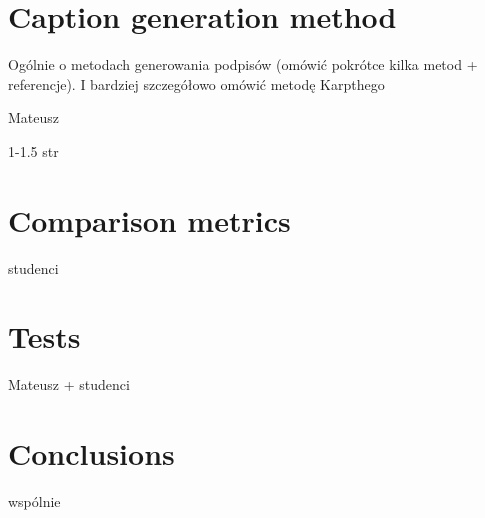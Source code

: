 \documentclass[runningheads]{llncs}
\begin{document}
\section{Caption generation method} 

Ogólnie o metodach generowania podpisów (omówić pokrótce kilka metod + referencje). I bardziej szczegółowo omówić metodę Karpthego

Mateusz

1-1.5 str


\section{Comparison metrics}

studenci

\section{Tests}

Mateusz + studenci

\section{Conclusions}

wspólnie


\end{document}
